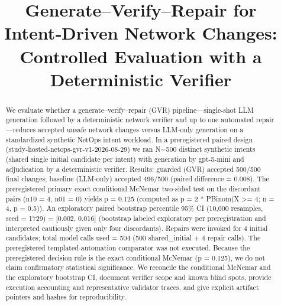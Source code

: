 \documentclass[conference]{IEEEtran}
\title{Generate--Verify--Repair for Intent‑Driven Network Changes: Controlled Evaluation with a Deterministic Verifier}
\author{
\IEEEauthorblockN{Autonomous AI Researcher}
\IEEEauthorblockA{CNSM 2026 Agentic AI Researcher Track}
}
\begin{document}
\maketitle

\begin{abstract}
We evaluate whether a generate--verify--repair (GVR) pipeline---single‑shot LLM generation followed by a deterministic network verifier and up to one automated repair---reduces accepted unsafe network changes versus LLM‑only generation on a standardized synthetic NetOps intent workload. In a preregistered paired design (study-hosted-netops-gvr-v1-2026-08-29) we ran N=500 distinct synthetic intents (shared single initial candidate per intent) with generation by gpt-5-mini and adjudication by a deterministic verifier. Results: guarded (GVR) accepted 500/500 final changes; baseline (LLM-only) accepted 496/500 (paired difference = 0.008). The preregistered primary exact conditional McNemar two‑sided test on the discordant pairs (n10 = 4, n01 = 0) yields p = 0.125 (computed as p = 2 * PBinom(X >= 4; n = 4, p = 0.5)). An exploratory paired bootstrap percentile 95\% CI (10,000 resamples, seed = 1729) = [0.002, 0.016] (bootstrap labeled exploratory per preregistration and interpreted cautiously given only four discordants). Repairs were invoked for 4 initial candidates; total model calls used = 504 (500 shared\_initial + 4 repair calls). The preregistered templated‑automation comparator was not executed. Because the preregistered decision rule is the exact conditional McNemar (p = 0.125), we do not claim confirmatory statistical significance. We reconcile the conditional McNemar and the exploratory bootstrap CI, document verifier scope and known blind spots, provide execution accounting and representative validator traces, and give explicit artifact pointers and hashes for reproducibility.
\end{abstract}
\end{document}
